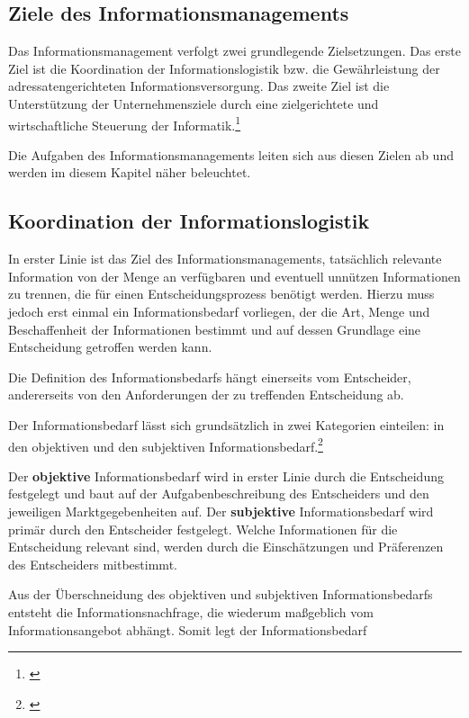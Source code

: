 \subsection{Ziele des Informationsmanagements}
Das Informationsmanagement verfolgt zwei grundlegende Zielsetzungen.
Das erste Ziel ist die Koordination der Informationslogistik bzw. die Gewährleistung der adressatengerichteten Informationsversorgung.
Das zweite Ziel ist die Unterstützung der Unternehmensziele durch eine zielgerichtete und wirtschaftliche Steuerung der Informatik.\footnote{\cite{zarnekow_intergriertes_2004}}

Die Aufgaben des Informationsmanagements leiten sich aus diesen Zielen ab und werden im diesem Kapitel näher beleuchtet.

\subsection{Koordination der Informationslogistik}
\label{subsection_koordination_informationslogistik}
In erster Linie ist das Ziel des Informationsmanagements, tatsächlich relevante Information von der Menge an verfügbaren und eventuell unnützen Informationen zu trennen, die für einen Entscheidungsprozess benötigt werden. Hierzu muss jedoch erst einmal ein Informationsbedarf vorliegen, der die Art, Menge und Beschaffenheit der Informationen bestimmt und auf dessen Grundlage eine Entscheidung getroffen werden kann.

Die Definition des Informationsbedarfs hängt einerseits vom Entscheider, andererseits von den Anforderungen der zu treffenden Entscheidung ab.

Der Informationsbedarf lässt sich grundsätzlich in zwei Kategorien einteilen: in den objektiven und den subjektiven Informationsbedarf.\footnote{\cite{picot_grenzenlos_2003}}

Der \textbf{objektive} Informationsbedarf wird in erster Linie durch die Entscheidung festgelegt und baut auf der Aufgabenbeschreibung des Entscheiders und den jeweiligen Marktgegebenheiten auf.
Der \textbf{subjektive} Informationsbedarf wird primär durch den Entscheider festgelegt. Welche Informationen für die Entscheidung relevant sind, werden durch die Einschätzungen und Präferenzen des Entscheiders mitbestimmt.

Aus der Überschneidung des objektiven und subjektiven Informationsbedarfs entsteht die Informationsnachfrage, die wiederum maßgeblich vom Informationsangebot abhängt. Somit legt der Informationsbedarf


